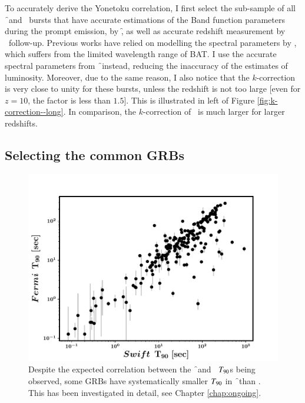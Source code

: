 To accurately derive the Yonetoku correlation, I first select the sub-sample of all \f\ and \s\ bursts that have accurate estimations of the Band function  parameters during the prompt emission, by \f, as well as accurate redshift measurement by \s\ follow-up. Previous works have relied on modelling the spectral parameters by \s, which suffers from the limited wavelength range of BAT. I use the accurate spectral parameters from \f\ instead, reducing the inaccuracy of the estimates of luminosity. Moreover, due to the same reason, I also notice that the $k$-correction is very close to unity for these bursts, unless the redshift is not too large [even for $z = 10$, the factor is less than $1.5$]. This is illustrated in left of Figure \ref{fig:k-correction--long}. In comparison, the $k$-correction of \s\ is much larger for larger redshifts.



\subsection{Selecting the common GRBs}
\label{sec:selecting_common_GRBs}

\begin{figure}
\begin{center}
\includegraphics[scale=0.5]{comparing_T90s_of_common_GRBS--all}
\caption[Comparison of $\T$s of \f\ and \s\, GRBs]{Despite the expected correlation between the \f\ and \s\ $\T$s being observed, some GRBs have systematically smaller $\T$ in \f\ than \s. This has been investigated in detail, see Chapter \ref{chap:ongoing}.}
\label{fig:T90_comparison}
\end{center}
\end{figure}

